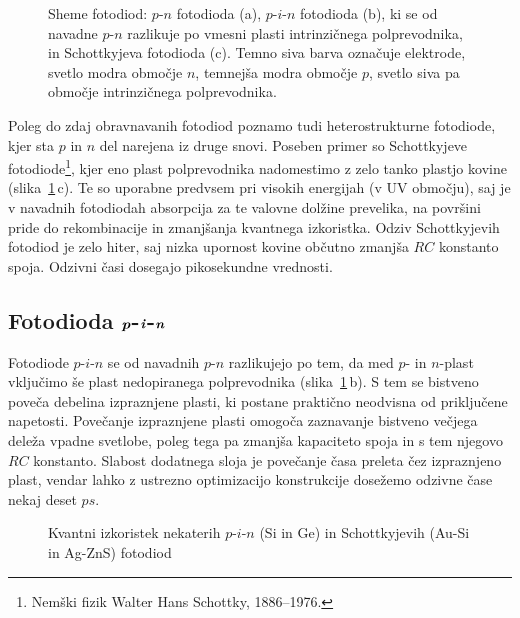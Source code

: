 \begin{figure}[h]
\centering
\def\svgwidth{140truemm} 

\caption{Sheme fotodiod: $p$-$n$ fotodioda (a), $p$-$i$-$n$ fotodioda (b),  ki se od 
navadne $p$-$n$ razlikuje po vmesni plasti intrinzičnega
polprevodnika, in Schottkyjeva fotodioda (c). 
Temno siva barva označuje elektrode, svetlo modra območje $n$, 
temnejša modra območje $p$, svetlo siva pa območje intrinzičnega polprevodnika. }
\label{11_shema}
\end{figure}
\begin{remark}
Poleg do zdaj obravnavanih fotodiod poznamo tudi heterostrukturne 
fotodiode, kjer sta $p$ in $n$ del
narejena iz druge snovi. Poseben primer so Schottkyjeve fotodiode\footnote{Nemški fizik
Walter Hans Schottky, 1886--1976.}, kjer eno plast polprevodnika
nadomestimo z zelo tanko plastjo kovine (slika~\ref{11_shema}\,c). Te so uporabne predvsem pri 
visokih energijah (v UV območju), 
saj je v navadnih fotodiodah absorpcija za te valovne dolžine prevelika, na površini pride do 
rekombinacije in zmanjšanja kvantnega izkoristka. Odziv Schottkyjevih fotodiod je zelo hiter, 
saj nizka upornost kovine občutno zmanjša $RC$ konstanto spoja. Odzivni časi 
dosegajo pikosekundne vrednosti. 
\end{remark}

\subsection*{Fotodioda $\textbf{\textit{p}}$-$\textbf{\textit{i}}$-$\textbf{\textit{n}}$}
Fotodiode $p$-$i$-$n$ se od navadnih $p$-$n$ razlikujejo po tem, da med $p$- in $n$-plast 
vključimo še plast nedopiranega polprevodnika (slika~\ref{11_shema}\,b). 
S tem se bistveno poveča debelina
izpraznjene plasti, ki postane praktično neodvisna od priključene napetosti.
Povečanje izpraznjene plasti omogoča zaznavanje bistveno večjega deleža vpadne svetlobe, 
poleg tega pa zmanjša kapaciteto spoja in s tem njegovo $RC$ konstanto. Slabost dodatnega
sloja je povečanje časa preleta čez izpraznjeno plast, vendar lahko
z ustrezno optimizacijo konstrukcije dosežemo odzivne čase nekaj deset $\si{ps}$.

\begin{figure}[h]
\centering
\def\svgwidth{120truemm} 

\caption{Kvantni izkoristek nekaterih $p$-$i$-$n$ (Si in Ge) in Schottkyjevih (Au-Si in Ag-ZnS)
fotodiod}
\label{11_odziv}
\end{figure}

